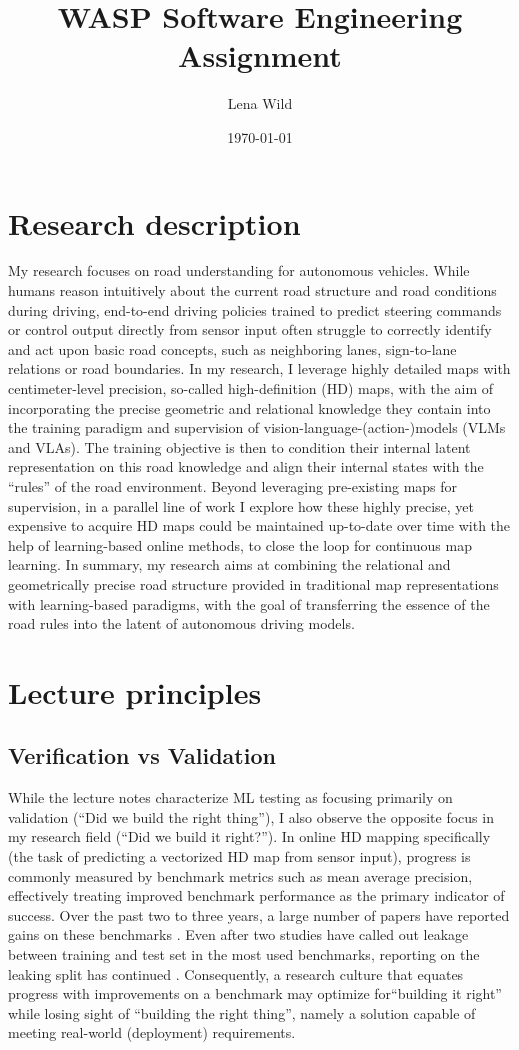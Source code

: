 \documentclass[11pt]{article}
\title{WASP Software Engineering Assignment}
\author{Lena Wild}
\date{\today}
\begin{document}
\maketitle

\section{Research description}
My research focuses on road understanding for autonomous vehicles. While humans reason intuitively about the current road structure and road conditions during driving, end-to-end driving policies trained to predict steering commands or control output directly from sensor input often struggle to correctly identify and act upon basic road concepts, such as neighboring lanes, sign-to-lane relations or road boundaries. In my research, I leverage highly detailed maps with centimeter-level precision, so-called high-definition (HD) maps, with the aim of incorporating the precise geometric and relational knowledge they contain into the training paradigm and supervision of vision-language-(action-)models (VLMs and VLAs). The training objective is then to condition their internal latent representation on this road knowledge and align their internal states with the ``rules'' of the road environment. 
Beyond leveraging pre-existing maps for supervision, in a parallel line of work I explore how these highly precise, yet expensive to acquire HD maps could be maintained up-to-date over time with the help of learning-based online methods, to close the loop for continuous map learning.
In summary, my research aims at combining the relational and geometrically precise road structure provided in traditional map representations with learning-based paradigms, with the goal of transferring the essence of the road rules into the latent of autonomous driving models.

\section{Lecture principles}
\subsection{Verification vs Validation}
While the lecture notes characterize ML testing as focusing primarily on validation (``Did we build the right thing''), I also observe the opposite focus in my research field (``Did we build it right?''). In online HD mapping specifically (the task of predicting a vectorized HD map from sensor input), progress is commonly measured by benchmark metrics such as mean average precision, effectively treating improved benchmark performance as the primary indicator of success. Over the past two to three years, a large number of papers have reported gains on these benchmarks \cite{maptr, maptrv2, lanesegnet}. Even after two studies have called out leakage between training and test set in the most used benchmarks, reporting on the leaking split has continued \cite{lilja, streammapnet}. Consequently, a research culture that equates progress with improvements on a benchmark may optimize for``building it right'' while losing sight of ``building the right thing'', namely a solution capable of meeting real-world (deployment) requirements. 
\end{document}
